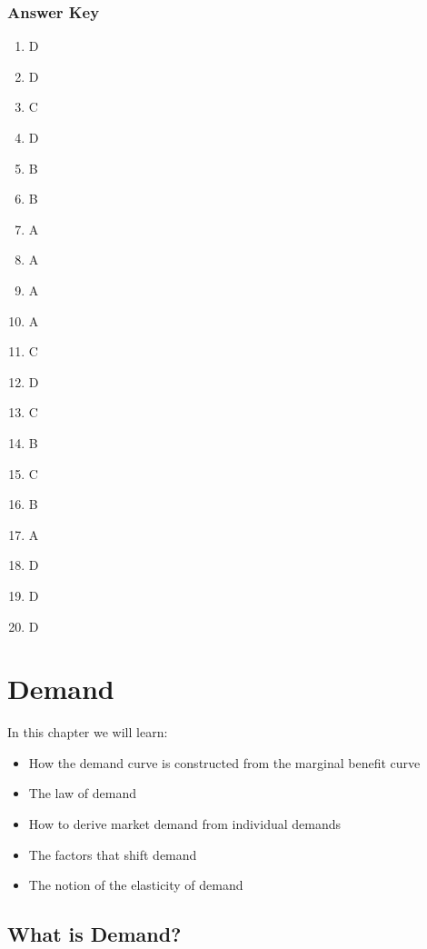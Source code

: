 \documentclass[
]{book}
\providecommand{\tightlist}{%
  \setlength{\itemsep}{0pt}\setlength{\parskip}{0pt}}
\begin{document}
\hypertarget{answer-key-1}{%
\subsection{Answer Key}\label{answer-key-1}}

\begin{enumerate}
\def\labelenumi{\arabic{enumi}.}
\tightlist
\item
  D
\item
  D
\item
  C
\item
  D
\item
  B
\item
  B
\item
  A
\item
  A
\item
  A
\item
  A
\item
  C
\item
  D
\item
  C
\item
  B
\item
  C
\item
  B
\item
  A
\item
  D
\item
  D
\item
  D
\end{enumerate}

\hypertarget{demand}{%
\chapter{Demand}\label{demand}}

In this chapter we will learn:

\begin{itemize}
\tightlist
\item
  How the demand curve is constructed from the marginal benefit curve
\item
  The law of demand
\item
  How to derive market demand from individual demands\\
\item
  The factors that shift demand
\item
  The notion of the elasticity of demand
\end{itemize}

\hypertarget{what-is-demand}{%
\section{What is Demand?}\label{what-is-demand}}
\end{document}
